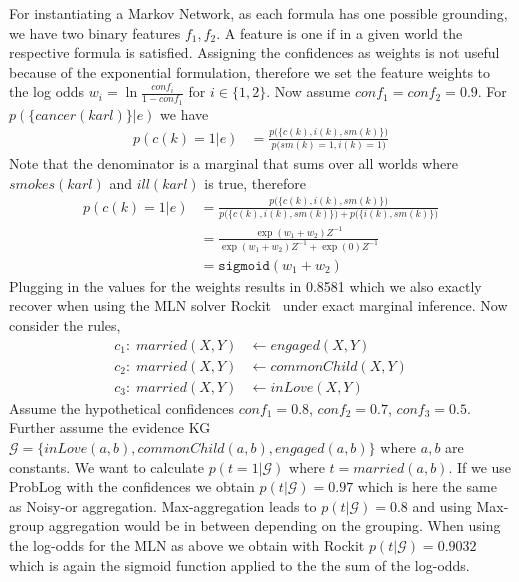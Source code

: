\documentclass{article}
\theoremstyle{plain}
\theoremstyle{remark}
\newcommand{\alltriples}{\mathcal{G}}
\begin{document}
{For instantiating a Markov Network, as each formula has one possible grounding, we have two binary features $f_1, f_2$. A feature is one if in a given world the respective formula is satisfied. Assigning the confidences as weights is not useful because of the exponential formulation, therefore we set the feature weights to the log odds $w_i=\ln \frac{conf_i}{1-conf_1}$ for $i \in \{1,2\}$. Now assume $conf_1=conf_2=0.9$. For $p(\{cancer(karl)\}| e)$ we have
\begin{align*}
    p(c(k)=1| e) &= \frac{p\big(\big\{c(k), i(k), sm(k)\big\}\big)}{p\big(sm(k)=1, i(k)=1\big)}
\end{align*}
Note that the denominator is a marginal that sums over all worlds where $smokes(karl)$ and $ill(karl)$ is true, therefore
\begin{align*}
    p(c(k)=1| e) &= \frac{p\big(\big\{c(k), i(k), sm(k)\big\}\big)}{p\big(\big\{c(k), i(k), sm(k)\big\}\big) + p\big(\big\{ i(k), sm(k)\big\}\big) }\\
    &=\frac{\exp{(w_1 + w_2)}Z^{-1}}{\exp{(w_1 + w_2)}Z^{-1} + \exp{(0)}Z^{-1}}\\
    &=\mathtt{sigmoid}(w_1+w_2)
\end{align*}
Plugging in the values for the weights results in 0.8581 which we also exactly recover when using the MLN solver Rockit~\cite{noessner2013rockit} under exact marginal inference. Now consider the rules,
\begin{align*}
c_1{:} \; married(X,Y) &\leftarrow engaged(X,Y) \\
c_2{:} \; married(X,Y) &\leftarrow commonChild(X,Y)  \\
c_3{:} \; married(X,Y) &\leftarrow inLove(X,Y) 
\end{align*}
Assume the hypothetical confidences $conf_1=0.8$, $conf_2=0.7$, $conf_3=0.5$. Further assume the evidence KG $\alltriples=\{inLove(a, b), commonChild(a, b), engaged(a, b) \}$ where $a,b$ are constants. We want to calculate $p(t=1 | \alltriples)$ where $t=married(a,b)$.  If we use ProbLog with the confidences we obtain $p(t | \alltriples)=0.97$ which is here the same as Noisy-or aggregation. Max-aggregation leads to $p(t | \alltriples)=0.8$ and using Max-group aggregation would be in between depending on the grouping. When using the log-odds for the MLN as above we obtain with Rockit  $p(t | \alltriples)=0.9032$ which is again the sigmoid function applied to the the sum of the log-odds.

}
\end{document}
